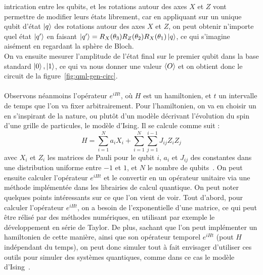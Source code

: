intrication entre les qubits, et les rotations autour des axes $X$ et $Z$ vont permettre
de modifier leurs états librement, car en appliquant sur un unique qubit d'état $\ket{q}$
des rotations autour des axes $X$ et $Z$, on peut obtenir n'importe quel état $\ket{q'}$
en faisant $\ket{q'} = R_X(\theta_3) R_Z(\theta_2) R_X(\theta_1)\ket{q}$, ce qui s'imagine
aisément en regardant la sphère de Bloch.\\
On va ensuite mesurer l'amplitude de l'état final sur le premier qubit dans la base
standard ${\ket{0},\ket{1}}$, ce qui va nous donner une valeur $\expval{O}$ et on obtient
donc le circuit de la figure~\ref{fig:qml-gen-circ}.\\ \\
Observons néanmoins l'opérateur $e^{iHt}$, où $H$ est un hamiltonien, et $t$ un intervalle
de temps que l'on va fixer arbitrairement.
Pour l'hamiltonien, on va en choisir un en s'inspirant de la nature, ou plutôt d'un modèle
décrivant l'évolution du spin d'une grille de particules, le modèle d'Ising.
Il se calcule comme suit :
\[
    H = \sum_{i=1}^{N} a_i X_i + \sum_{i=1}^{N} \sum_{j=1}^{i-1}J_{ij}Z_i Z_j
\]
avec $X_i$ et $Z_i$ les matrices de Pauli pour le qubit $i$, $a_i$ et $J_{ij}$ des constantes
dans une distribution uniforme entre $-1$ et $1$, et $N$ le nombre de qubits~\cite{ham-qml}.
On peut ensuite calculer l'opérateur $e^{iHt}$ et le convertir en un opérateur unitaire
via une méthode implémentée dans les librairies de calcul quantique.
On peut noter quelques points intéressants sur ce que l'on vient de voir.
Tout d'abord, pour calculer l'opérateur $e^{iHt}$, on a besoin de l'exponentielle d'une
matrice, ce qui peut être rélisé par des méthodes numériques, en utilisant par exemple
le développement en série de Taylor.
De plus, sachant que l'on peut implémenter un hamiltonien de cette manière, ainsi que son
opérateur temporel $e^{iHt}$ (pout $H$ indépendant du temps), on peut donc simuler tout
à fait envisager d'utiliser ces outils pour simuler des systèmes quantiques, comme dans ce
cas le modèle d'Ising~\cite{ising-qiskit}.
